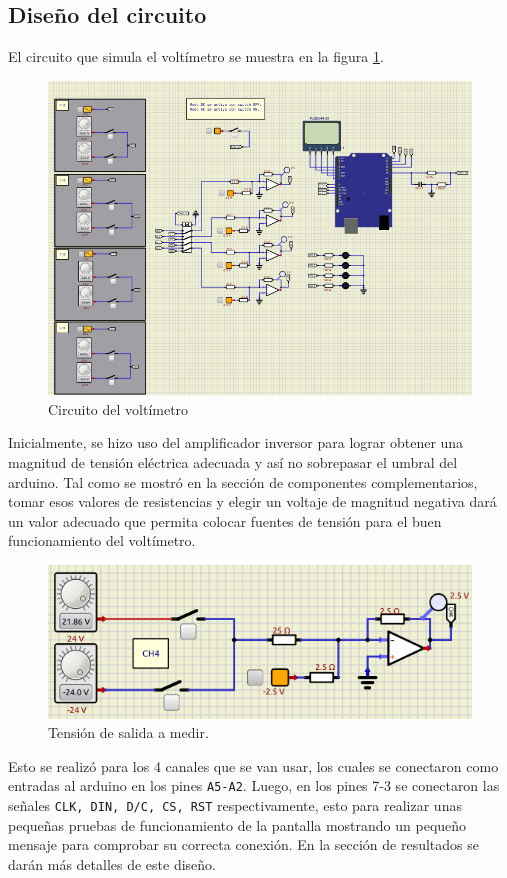 \subsection*{Diseño del circuito}
El circuito que simula el voltímetro se muestra en la figura \ref{fig3}.
\begin{figure}[H]
\centering
\includegraphics[width=.8\linewidth]{Imagenes/3.png}
 \caption{Circuito del voltímetro}
 \label{fig3}
\end{figure}
Inicialmente, se hizo uso del amplificador inversor para lograr obtener una magnitud de tensión eléctrica adecuada y así no sobrepasar el umbral del arduino. Tal como se mostró en la sección de componentes complementarios, tomar esos valores de resistencias y elegir un voltaje de magnitud negativa dará un valor adecuado que permita colocar fuentes de tensión para el buen funcionamiento del voltímetro. 
\begin{figure}[H]
\centering
\includegraphics[width=.8\linewidth]{Imagenes/4.png}
 \caption{Tensión de salida a medir.}
 \label{fig4}
\end{figure}
Esto se realizó para los 4 canales que se van usar, los cuales se conectaron como entradas al arduino en los pines \texttt{A5-A2}. Luego, en los pines 7-3 se conectaron las señales \texttt{CLK, DIN, D/C, CS, RST} respectivamente, esto para realizar unas pequeñas pruebas de funcionamiento de la pantalla mostrando un pequeño mensaje para comprobar su correcta conexión. En la sección de resultados se darán más detalles de este diseño.
